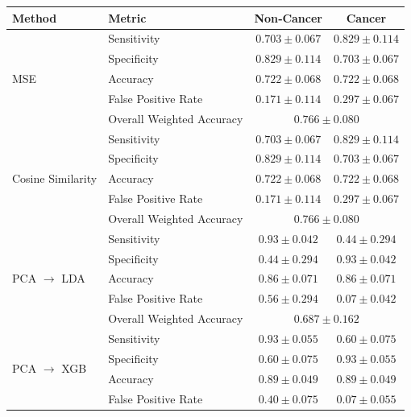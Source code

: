 \begin{table}[htbp]
\centering
\begin{tabular}{llcc}
\toprule
Method & Metric & Non‐Cancer & Cancer \\
\midrule
\multirow{5}{*}{MSE} 
       & Sensitivity           & $0.703\pm0.067$     & $0.829\pm0.114$    \\
       & Specificity           & $0.829\pm0.114$     & $0.703\pm0.067$    \\
       & Accuracy              & $0.722\pm0.068$     & $0.722\pm0.068$    \\
       & False Positive Rate   & $0.171\pm0.114$     & $0.297\pm0.067$    \\
       & Overall Weighted Accuracy & \multicolumn{2}{c}{$0.766\pm0.080$} \\
\midrule
\multirow{5}{*}{Cosine Similarity} 
       & Sensitivity           & $0.703\pm0.067$     & $0.829\pm0.114$    \\
       & Specificity           & $0.829\pm0.114$     & $0.703\pm0.067$    \\
       & Accuracy              & $0.722\pm0.068$     & $0.722\pm0.068$    \\
       & False Positive Rate   & $0.171\pm0.114$     & $0.297\pm0.067$    \\
       & Overall Weighted Accuracy & \multicolumn{2}{c}{$0.766\pm0.080$} \\
\midrule
\multirow{5}{*}{PCA $\rightarrow$ LDA} 
       & Sensitivity           & $0.93\pm0.042$      & $0.44\pm0.294$     \\
       & Specificity           & $0.44\pm0.294$      & $0.93\pm0.042$     \\
       & Accuracy              & $0.86\pm0.071$      & $0.86\pm0.071$     \\
       & False Positive Rate   & $0.56\pm0.294$      & $0.07\pm0.042$     \\
       & Overall Weighted Accuracy & \multicolumn{2}{c}{$0.687\pm0.162$} \\
\midrule
\multirow{5}{*}{PCA $\rightarrow$ XGB} 
       & Sensitivity           & $0.93\pm0.055$      & $0.60\pm0.075$     \\
       & Specificity           & $0.60\pm0.075$      & $0.93\pm0.055$     \\
       & Accuracy              & $0.89\pm0.049$      & $0.89\pm0.049$     \\
       & False Positive Rate   & $0.40\pm0.075$      & $0.07\pm0.055$     \\

\end{tabular}
\end{table}
